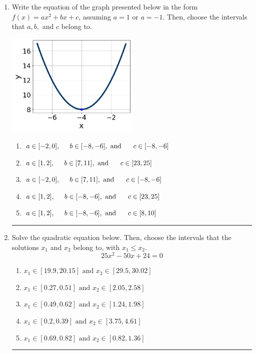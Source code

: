 \documentclass[14pt]{extbook}
\newcommand{\litem}[1]{\item#1\hspace*{-1cm}\rule{\textwidth}{0.4pt}}
\begin{document}
\begin{enumerate}
{\begin{enumerate}[label=\Alph*.]
\end{enumerate} }
\litem{
Write the equation of the graph presented below in the form $f(x)=ax^2+bx+c$, assuming  $a=1$ or $a=-1$. Then, choose the intervals that $a, b,$ and $c$ belong to.
\begin{center}
    \includegraphics[width=0.5\textwidth]{../Figures/quadraticGraphToEquationA.png}
\end{center}
\begin{enumerate}[label=\Alph*.]
\item \( a \in [-2, 0], \hspace*{5mm} b \in [-8, -6], \text{ and } \hspace*{5mm} c \in [-8, -6] \)
\item \( a \in [1, 2], \hspace*{5mm} b \in [7, 11], \text{ and } \hspace*{5mm} c \in [23, 25] \)
\item \( a \in [-2, 0], \hspace*{5mm} b \in [7, 11], \text{ and } \hspace*{5mm} c \in [-8, -6] \)
\item \( a \in [1, 2], \hspace*{5mm} b \in [-8, -6], \text{ and } \hspace*{5mm} c \in [23, 25] \)
\item \( a \in [1, 2], \hspace*{5mm} b \in [-8, -6], \text{ and } \hspace*{5mm} c \in [8, 10] \)

\end{enumerate} }
\litem{
Solve the quadratic equation below. Then, choose the intervals that the solutions $x_1$ and $x_2$ belong to, with $x_1 \leq x_2$.\[ 25x^{2} -50 x + 24 = 0 \]\begin{enumerate}[label=\Alph*.]
\item \( x_1 \in [19.9, 20.15] \text{ and } x_2 \in [29.5, 30.02] \)
\item \( x_1 \in [0.27, 0.51] \text{ and } x_2 \in [2.05, 2.58] \)
\item \( x_1 \in [0.49, 0.62] \text{ and } x_2 \in [1.24, 1.98] \)
\item \( x_1 \in [0.2, 0.39] \text{ and } x_2 \in [3.75, 4.61] \)
\item \( x_1 \in [0.69, 0.82] \text{ and } x_2 \in [0.82, 1.36] \)


\end{enumerate}}
\end{enumerate}
\end{document}

